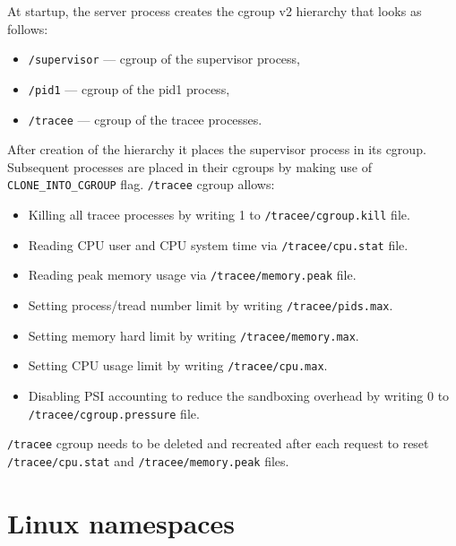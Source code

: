 \documentclass[en]{pracamgr}
\begin{document}
At startup, the server process creates the cgroup v2 hierarchy that looks as follows:
\begin{itemize}
    \item \texttt{/supervisor} --- cgroup of the supervisor process,
    \item \texttt{/pid1} --- cgroup of the pid1 process,
    \item \texttt{/tracee} --- cgroup of the tracee processes.
\end{itemize}
After creation of the hierarchy it places the supervisor process in its cgroup. Subsequent processes are placed in their cgroups by making use of \texttt{CLONE\_INTO\_CGROUP} flag.
\newline
\texttt{/tracee} cgroup allows:
\begin{itemize}
    \item Killing all tracee processes by writing 1 to \texttt{/tracee/cgroup.kill} file.
    \item Reading CPU user and CPU system time via \texttt{/tracee/cpu.stat} file.
    \item Reading peak memory usage via \texttt{/tracee/memory.peak} file.
    \item Setting process/tread number limit by writing \texttt{/tracee/pids.max}.
    \item Setting memory hard limit by writing \texttt{/tracee/memory.max}.
    \item Setting CPU usage limit by writing \texttt{/tracee/cpu.max}.
    \item Disabling PSI accounting to reduce the sandboxing overhead by writing 0 to \\\texttt{/tracee/cgroup.pressure} file.
\end{itemize}
\texttt{/tracee} cgroup needs to be deleted and recreated after each request to reset \texttt{/tracee/cpu.stat} and \texttt{/tracee/memory.peak} files.

\section{Linux namespaces}
\end{document}
